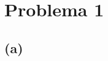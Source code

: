 \documentclass[10 pt]{article}
\begin{document}
    \section*{Problema 1}
        \subsection*{(a)}
\end{document}
